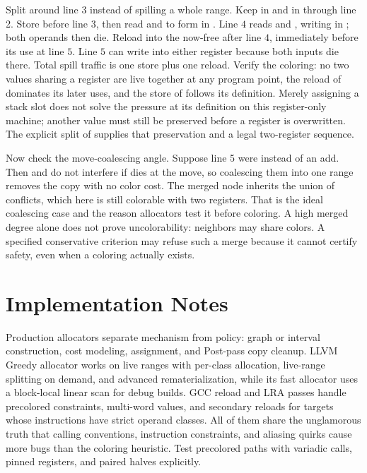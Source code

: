 Split  around line 3 instead of spilling a whole range.
Keep  in  and  in  through line 2.
Store  before line $3$, then read  and  to form  in .
Line $4$ reads  and , writing  in ; both operands then die.
Reload  into the now-free  after line $4$, immediately before its use at line $5$.
Line $5$ can write  into either register because both inputs die there.
Total spill traffic is one store plus one reload.
Verify the coloring: no two values sharing a register are live together at any program point, the reload of  dominates its later uses, and the store of  follows its definition.
Merely assigning  a stack slot does not solve the pressure at its definition on this register-only machine; another value must still be preserved before a register is overwritten.
The explicit split of  supplies that preservation and a legal two-register sequence.

Now check the move-coalescing angle.
Suppose line 5 were  instead of an add.
Then  and  do not interfere if  dies at the move, so coalescing them into one range removes the copy with no color cost.
The merged node inherits the union of conflicts, which here is still colorable with two registers.
That is the ideal coalescing case and the reason allocators test it before coloring.
A high merged degree alone does not prove uncolorability: neighbors may share colors.
A specified conservative criterion may refuse such a merge because it cannot certify safety, even when a coloring actually exists.

\section{Implementation Notes}\label{sec:ch27-implementation}

Production allocators separate mechanism from policy: graph or interval construction, cost modeling, assignment, and Post-pass copy cleanup.
LLVM Greedy allocator works on live ranges with per-class allocation, live-range splitting on demand, and advanced rematerialization, while its fast allocator uses a block-local linear scan for debug builds.
GCC reload and LRA passes handle precolored constraints, multi-word values, and secondary reloads for targets whose instructions have strict operand classes.
All of them share the unglamorous truth that calling conventions, instruction constraints, and aliasing quirks cause more bugs than the coloring heuristic.
Test precolored paths with variadic calls, pinned registers, and paired halves explicitly.


